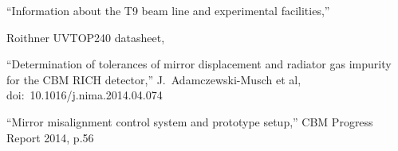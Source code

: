 \begin{thebibliography}{99}
``Information about the T9 beam line and experimental facilities,''

Roithner UVTOP240 datasheet,

``Determination of tolerances of mirror displacement and radiator gas impurity for the CBM RICH detector,''
J.~Adamczewski-Musch et al,
doi:~10.1016/j.nima.2014.04.074

``Mirror misalignment control system and prototype setup,''
CBM Progress Report 2014, p.56

\end{thebibliography}

